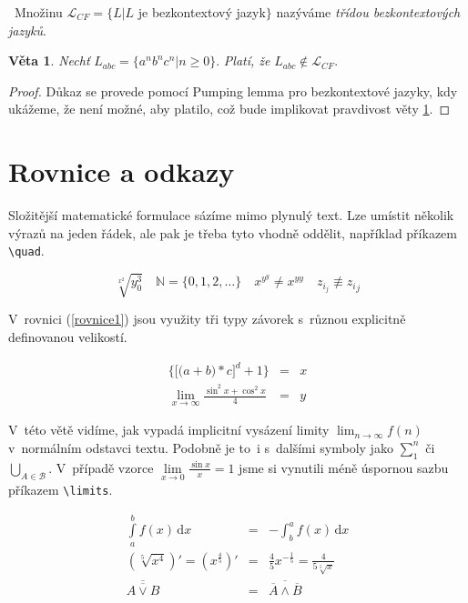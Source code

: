 \documentclass[a4paper,11pt,twocolumn]{article}[2014-03-27]
\begin{document}
\begin{definice}\  Množinu $\mathcal{L}_{CF} = \{L | L$ je bezkontextový jazyk$\}$ nazýváme \emph{třídou bezkontextových jazyků}.
\end{definice}

\theoremstyle{definition}
\newtheorem{lemma}{Věta}

\begin{lemma} \emph{Nechť} $L_{abc} = \{ a^n b^n c^n | n \geq 0 \}$. \emph{Platí, že} $L_{abc} \not\in \mathcal{L}_{CF}$. \label{veta1}
\end{lemma}

\begin{proof}
Důkaz se provede pomocí Pumping lemma pro bezkontextové jazyky, kdy ukážeme, že není možné, aby platilo, což bude implikovat pravdivost věty \ref{veta1}.
\end{proof}


\section{Rovnice a odkazy}
Složitější matematické formulace sázíme mimo plynulý text. Lze umístit několik výrazů na jeden řádek, ale pak je třeba tyto vhodně oddělit, například pří\-kazem \verb|\quad|.

$$\sqrt[x^2]{y^3_0} \quad \mathbb{N} = \{0,1,2,\ldots \} \quad x^{y^y} \neq x^{yy} \quad z_{i_j} \not\equiv {z_i}_j$$

V~rovnici (\ref{rovnice1}) jsou využity tři typy závorek s~rů\-znou explicitně definovanou velikostí.

\begin{eqnarray}
\bigg\{\Big[\big(a + b\big) * c\Big]^d+1\bigg\}& = & x\label{rovnice1} \\ \nonumber
\lim_{x \to \infty}\frac{\sin ^2x + \cos ^2x}{4} &=& y
\end{eqnarray}

V~této větě vidíme, jak vypadá implicitní vysázení limity $\lim_{n \to \infty}f(n)$ v~normálním odstavci textu. Podobně je to~i s~dalšími symboly jako $\sum_1^n$ či $\bigcup_{A\in \mathcal{B}}$. V~případě vzorce $\lim\limits_{x \to 0}\frac{\sin x}{x}=1$ jsme si vynutili méně úspornou sazbu příkazem \verb|\limits|.

\begin{eqnarray}
 \int\limits_a^b f(x)\,\mathrm{d}x &=& -\int_b^a f(x)\,\mathrm{d}x  \\
\left(\sqrt[5]{x^4}\right)' = \left(x^{\frac{4}{5}}\right)' &=& \frac{4}{5}x^{-\frac{1}{5}} = \frac{4}{5\sqrt[5]{x}}\\
\overline{\overline{A \vee B}} &=& \overline{\overline{A} \wedge \overline{B}}
\end{eqnarray}
\end{document}
